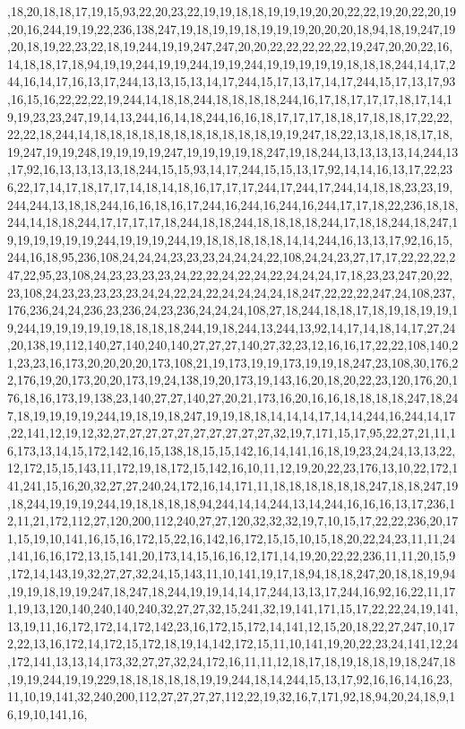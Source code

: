 ,18,20,18,18,17,19,15,93,22,20,23,22,19,19,18,18,19,19,19,20,20,22,22,19,20,22,20,19,20,16,244,19,19,22,236,138,247,19,18,19,19,18,19,19,19,20,20,20,18,94,18,19,247,19,20,18,19,22,23,22,18,19,244,19,19,247,247,20,20,22,22,22,22,22,19,247,20,20,22,16,14,18,18,17,18,94,19,19,244,19,19,244,19,19,244,19,19,19,19,19,18,18,18,244,14,17,244,16,14,17,16,13,17,244,13,13,15,13,14,17,244,15,17,13,17,14,17,244,15,17,13,17,93,16,15,16,22,22,22,19,244,14,18,18,244,18,18,18,18,244,16,17,18,17,17,17,18,17,14,19,19,23,23,247,19,14,13,244,16,14,18,244,16,16,18,17,17,17,18,18,17,18,18,17,22,22,22,22,18,244,14,18,18,18,18,18,18,18,18,18,18,18,19,19,247,18,22,13,18,18,18,17,18,19,247,19,19,248,19,19,19,19,247,19,19,19,19,18,247,19,18,244,13,13,13,13,14,244,13,17,92,16,13,13,13,13,18,244,15,15,93,14,17,244,15,15,13,17,92,14,14,16,13,17,22,236,22,17,14,17,18,17,17,14,18,14,18,16,17,17,17,244,17,244,17,244,14,18,18,23,23,19,244,244,13,18,18,244,16,16,18,16,17,244,16,244,16,244,16,244,17,17,18,22,236,18,18,244,14,18,18,244,17,17,17,17,18,244,18,18,244,18,18,18,18,244,17,18,18,244,18,247,19,19,19,19,19,19,244,19,19,19,244,19,18,18,18,18,18,14,14,244,16,13,13,17,92,16,15,244,16,18,95,236,108,24,24,24,23,23,23,24,24,24,22,108,24,24,23,27,17,17,22,22,22,247,22,95,23,108,24,23,23,23,23,24,22,22,24,22,24,22,24,24,24,17,18,23,23,247,20,22,23,108,24,23,23,23,23,23,24,24,22,24,22,24,24,24,24,18,247,22,22,22,247,24,108,237,176,236,24,24,236,23,236,24,23,236,24,24,24,108,27,18,244,18,18,17,18,19,18,19,19,19,244,19,19,19,19,19,18,18,18,18,244,19,18,244,13,244,13,92,14,17,14,18,14,17,27,24,20,138,19,112,140,27,140,240,140,27,27,27,140,27,32,23,12,16,16,17,22,22,108,140,21,23,23,16,173,20,20,20,20,173,108,21,19,173,19,19,173,19,19,18,247,23,108,30,176,22,176,19,20,173,20,20,173,19,24,138,19,20,173,19,143,16,20,18,20,22,23,120,176,20,176,18,16,173,19,138,23,140,27,27,140,27,20,21,173,16,20,16,16,18,18,18,18,247,18,247,18,19,19,19,19,244,19,18,19,18,247,19,19,18,18,14,14,14,17,14,14,244,16,244,14,17,22,141,12,19,12,32,27,27,27,27,27,27,27,27,27,27,32,19,7,171,15,17,95,22,27,21,11,16,173,13,14,15,172,142,16,15,138,18,15,15,142,16,14,141,16,18,19,23,24,24,13,13,22,12,172,15,15,143,11,172,19,18,172,15,142,16,10,11,12,19,20,22,23,176,13,10,22,172,141,241,15,16,20,32,27,27,240,24,172,16,14,171,11,18,18,18,18,18,18,247,18,18,247,19,18,244,19,19,19,244,19,18,18,18,18,94,244,14,14,244,13,14,244,16,16,16,13,17,236,12,11,21,172,112,27,120,200,112,240,27,27,120,32,32,32,19,7,10,15,17,22,22,236,20,171,15,19,10,141,16,15,16,172,15,22,16,142,16,172,15,15,10,15,18,20,22,24,23,11,11,24,141,16,16,172,13,15,141,20,173,14,15,16,16,12,171,14,19,20,22,22,236,11,11,20,15,9,172,14,143,19,32,27,27,32,24,15,143,11,10,141,19,17,18,94,18,18,247,20,18,18,19,94,19,19,18,19,19,247,18,247,18,244,19,19,14,14,17,244,13,13,17,244,16,92,16,22,11,171,19,13,120,140,240,140,240,32,27,27,32,15,241,32,19,141,171,15,17,22,22,24,19,141,13,19,11,16,172,172,14,172,142,23,16,172,15,172,14,141,12,15,20,18,22,27,247,10,172,22,13,16,172,14,172,15,172,18,19,14,142,172,15,11,10,141,19,20,22,23,24,141,12,24,172,141,13,13,14,173,32,27,27,32,24,172,16,11,11,12,18,17,18,19,18,18,19,18,247,18,19,19,244,19,19,229,18,18,18,18,18,19,19,244,18,14,244,15,13,17,92,16,16,14,16,23,11,10,19,141,32,240,200,112,27,27,27,27,112,22,19,32,16,7,171,92,18,94,20,24,18,9,16,19,10,141,16,
